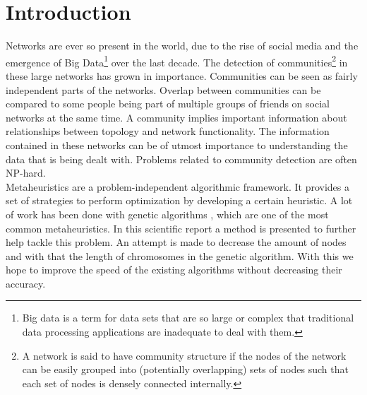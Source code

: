 \section{Introduction}\label{sec:introduction}

Networks are ever so present in the world, due to the rise of social media and the emergence of Big Data\footnote{Big data is a term for data sets that are so large or complex that traditional data processing applications are inadequate to deal with them.} over the last decade.
The detection of communities\footnote{A network is said to have community structure if the nodes of the network can be easily grouped into (potentially overlapping) sets of nodes such that each set of nodes is densely connected internally.} in these large networks has grown in importance.
Communities can be seen as fairly independent parts of the networks.
Overlap between communities can be compared to some people being part of multiple groups of friends on social networks at the same time.
A community implies important information about relationships between topology and network functionality.
The information contained in these networks can be of utmost importance to understanding the data that is being dealt with.
Problems related to community detection are often NP-hard.\\

Metaheuristics are a problem-independent algorithmic framework.
It provides a set of strategies to perform optimization by developing a certain heuristic.
A lot of work has been done with genetic algorithms \cite{Li2016, Newman2004}, which are one of the most common metaheuristics.
In this scientific report a method is presented to further help tackle this problem.
An attempt is made to decrease the amount of nodes and with that the length of chromosomes in the genetic algorithm.
With this we hope to improve the speed of the existing algorithms without decreasing their accuracy.
